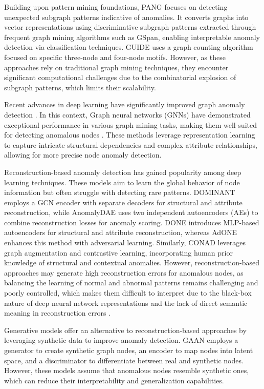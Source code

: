 \documentclass[pdflatex,sn-mathphys-num]{sn-jnl}%
\theoremstyle{thmstyleone}%
\theoremstyle{thmstyletwo}%
\theoremstyle{thmstylethree}%
\begin{document}
Building upon pattern mining foundations, PANG \cite{potin2023pattern} focuses on detecting unexpected subgraph patterns indicative of anomalies. It converts graphs into vector representations using discriminative subgraph patterns extracted through frequent graph mining algorithms such as GSpan, enabling interpretable anomaly detection via classification techniques. GUIDE \cite{yuan2024higherorder} uses a graph counting algorithm focused on specific three-node and four-node motifs. However, as these approaches rely on traditional graph mining techniques, they encounter significant computational challenges due to the combinatorial explosion of subgraph patterns, which limits their scalability.

Recent advances in deep learning have significantly improved graph anomaly detection \cite{zhang2020deep,wu2020comprehensive,Ma_2023,wu2022graph}. In this context, Graph neural networks (GNNs) have demonstrated exceptional performance in various graph mining tasks, making them well-suited for detecting anomalous nodes \cite{NEURIPS2022-acc1ec4a}. These methods leverage representation learning to capture intricate structural dependencies and complex attribute relationships, allowing for more precise node anomaly detection.

Reconstruction-based anomaly detection has gained popularity among deep learning techniques. These models aim to learn the global behavior of node information but often struggle with detecting rare patterns. DOMINANT \cite{ding2019deep} employs a GCN encoder with separate decoders for structural and attribute reconstruction, while AnomalyDAE \cite{fan2020anomalydae} uses two independent autoencoders (AEs) to combine reconstruction losses for anomaly scoring. DONE \cite{bandyopadhyay2020outlier} introduces MLP-based autoencoders for structural and attribute reconstruction, whereas AdONE \cite{bandyopadhyay2020outlier} enhances this method with adversarial learning. Similarly, CONAD \cite{xu2022contrastive} leverages graph augmentation and contrastive learning, incorporating human prior knowledge of structural and contextual anomalies. However, reconstruction-based approaches may generate high reconstruction errors for anomalous nodes, as balancing the learning of normal and abnormal patterns remains challenging and poorly controlled, which makes them difficult to interpret due to the black-box nature of deep neural network representations and the lack of direct semantic meaning in reconstruction errors \cite{Ruff_2021}.

Generative models offer an alternative to reconstruction-based approaches by leveraging synthetic data to improve anomaly detection. GAAN \cite{chen2020generative} employs a generator to create synthetic graph nodes, an encoder to map nodes into latent space, and a discriminator to differentiate between real and synthetic nodes. However, these models assume that anomalous nodes resemble synthetic ones, which can reduce their interpretability and generalization capabilities.
\end{document}
